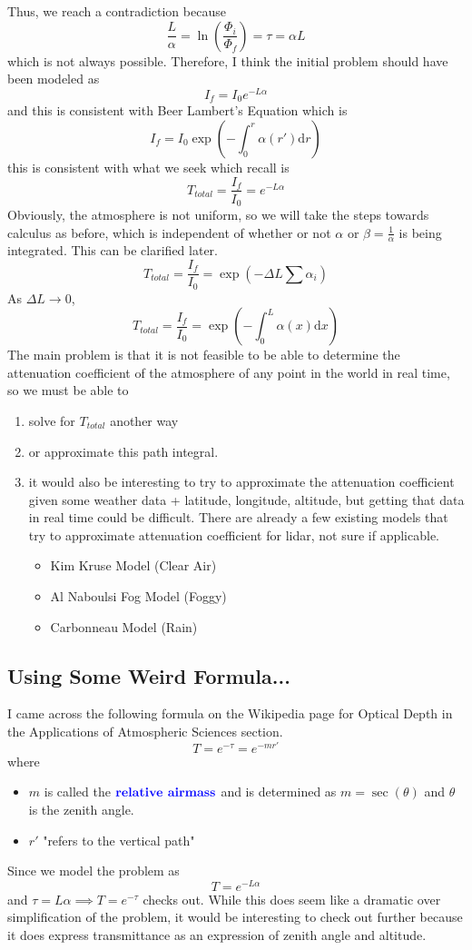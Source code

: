 \documentclass[12pt]{scrartcl}
\begin{document}
Thus, we reach a contradiction because 
\[\frac{L}{\alpha} = \ln(\frac{\Phi_i}{\Phi_f}) = \tau = \alpha L\]
which is not always possible. Therefore, I think the initial problem should have been modeled as \[I_f = I_0e^{-L\alpha}\]
and this is consistent with Beer Lambert's Equation which is 
\[I_f = I_0\exp(-\int_0^r \alpha(r')\text{d}r)\]
this is consistent with what we seek which recall is 
\[T_{total} = \frac{I_f}{I_0} = e^{-L\alpha}\]
Obviously, the atmosphere is not uniform, so we will take the steps towards calculus as before, which is independent of whether or not $\alpha$ or $\beta = \frac{1}{\alpha}$ is being integrated. This can be clarified later.
\[T_{total} = \frac{I_f}{I_0} = \exp({-\Delta L \sum \alpha_i})\]
As $\Delta L \to 0$,
\[T_{total} = \frac{I_f}{I_0} = \exp(-\int_0^L \alpha(x) \text{d}x)\]
The main problem is that it is not feasible to be able to determine the attenuation coefficient of the atmosphere of any point in the world in real time, so we must be able to
\begin{enumerate}
\item solve for $T_{total}$ another way
\item or approximate this path integral.
\item it would also be interesting to try to approximate the attenuation coefficient given some weather data + latitude, longitude, altitude, but getting that data in real time could be difficult. There are already a few existing models that try to approximate attenuation coefficient for lidar, not sure if applicable.
\begin{itemize}
    \item Kim Kruse Model (Clear Air)
    \item Al Naboulsi Fog Model (Foggy)
    \item Carbonneau Model (Rain)
    
\end{itemize}
\end{enumerate}

\subsection{Using Some Weird Formula...}

I came across the following formula on the Wikipedia page for Optical Depth in the Applications of Atmospheric Sciences section.
\[T = e^{-\tau} = e^{-mr'}\]
where 
\begin{itemize}
    \item $m$ is called the $\textbf{\color{blue} relative airmass}$ and is determined as $m = \sec(\theta)$ and $\theta$ is the zenith angle.
    \item $r'$ "refers to the vertical path"
\end{itemize}
Since we model the problem as 
\[T = e^{-L\alpha}\] and $\tau = L\alpha \implies T = e^{-\tau}$ checks out. While this does seem like a dramatic over simplification of the problem, it would be interesting to check out further because it does express transmittance as an expression of zenith angle and altitude.
\end{document}
